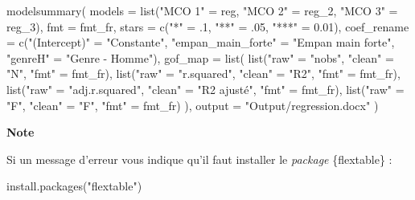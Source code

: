\documentclass[
  11pt,
]{book}
\newenvironment{Shaded}{\begin{snugshade}}{\end{snugshade}}
\newcommand{\AttributeTok}[1]{\textcolor[rgb]{0.77,0.63,0.00}{#1}}
\newcommand{\DecValTok}[1]{\textcolor[rgb]{0.00,0.00,0.81}{#1}}
\newcommand{\FloatTok}[1]{\textcolor[rgb]{0.00,0.00,0.81}{#1}}
\newcommand{\FunctionTok}[1]{\textcolor[rgb]{0.00,0.00,0.00}{#1}}
\newcommand{\NormalTok}[1]{#1}
\newcommand{\OtherTok}[1]{\textcolor[rgb]{0.56,0.35,0.01}{#1}}
\newcommand{\StringTok}[1]{\textcolor[rgb]{0.31,0.60,0.02}{#1}}
\numberwithin{equation}{section}
\numberwithin{countremarque}{section}
\newenvironment{notebox}{
  \begin{tcolorbox}[breakable, colback=jaune,coltext=black,
                  colframe=grisfonce]}
 {\end{tcolorbox}}
\begin{document}
\begin{Shaded}
\begin{Highlighting}[]
\FunctionTok{modelsummary}\NormalTok{(}
  \AttributeTok{models =} \FunctionTok{list}\NormalTok{(}\StringTok{"MCO 1"} \OtherTok{=}\NormalTok{ reg,}
                \StringTok{"MCO 2"} \OtherTok{=}\NormalTok{ reg\_2,}
                \StringTok{"MCO 3"} \OtherTok{=}\NormalTok{ reg\_3),}
  \AttributeTok{fmt =}\NormalTok{ fmt\_fr,}
  \AttributeTok{stars =} \FunctionTok{c}\NormalTok{(}\StringTok{"*"} \OtherTok{=}\NormalTok{ .}\DecValTok{1}\NormalTok{, }\StringTok{"**"} \OtherTok{=}\NormalTok{ .}\DecValTok{05}\NormalTok{, }\StringTok{"***"} \OtherTok{=} \FloatTok{0.01}\NormalTok{),}
  \AttributeTok{coef\_rename =} \FunctionTok{c}\NormalTok{(}\StringTok{"(Intercept)"} \OtherTok{=} \StringTok{"Constante"}\NormalTok{,}
                  \StringTok{"empan\_main\_forte"} \OtherTok{=} \StringTok{"Empan main forte"}\NormalTok{,}
                  \StringTok{"genreH"} \OtherTok{=} \StringTok{"Genre {-} Homme"}\NormalTok{),}
  \AttributeTok{gof\_map =} \FunctionTok{list}\NormalTok{(}
    \FunctionTok{list}\NormalTok{(}\StringTok{"raw"} \OtherTok{=} \StringTok{"nobs"}\NormalTok{, }\StringTok{"clean"} \OtherTok{=} \StringTok{"N"}\NormalTok{, }\StringTok{"fmt"} \OtherTok{=}\NormalTok{ fmt\_fr),}
    \FunctionTok{list}\NormalTok{(}\StringTok{"raw"} \OtherTok{=} \StringTok{"r.squared"}\NormalTok{, }\StringTok{"clean"} \OtherTok{=} \StringTok{"R2"}\NormalTok{, }\StringTok{"fmt"} \OtherTok{=}\NormalTok{ fmt\_fr),}
    \FunctionTok{list}\NormalTok{(}\StringTok{"raw"} \OtherTok{=} \StringTok{"adj.r.squared"}\NormalTok{, }\StringTok{"clean"} \OtherTok{=} \StringTok{"R2 ajusté"}\NormalTok{, }\StringTok{"fmt"} \OtherTok{=}\NormalTok{ fmt\_fr),}
    \FunctionTok{list}\NormalTok{(}\StringTok{"raw"} \OtherTok{=} \StringTok{"F"}\NormalTok{, }\StringTok{"clean"} \OtherTok{=} \StringTok{"F"}\NormalTok{, }\StringTok{"fmt"} \OtherTok{=}\NormalTok{ fmt\_fr)}
\NormalTok{  ),}
  \AttributeTok{output =} \StringTok{"Output/regression.docx"}
\NormalTok{)}
\end{Highlighting}
\end{Shaded}

\begin{notebox}

\textbf{Note}

Si un message d'erreur vous indique qu'il faut installer le \emph{package} \{flextable\} :

\begin{Shaded}
\begin{Highlighting}[]
\FunctionTok{install.packages}\NormalTok{(}\StringTok{"flextable"}\NormalTok{)}
\end{Highlighting}
\end{Shaded}

\end{notebox}
\end{document}
